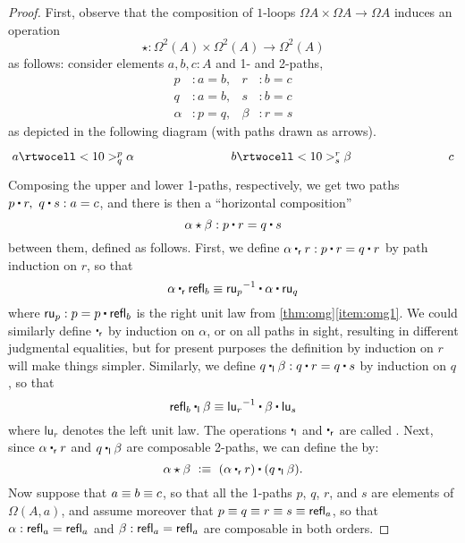 \begin{proof}
First, observe that the composition of $1$-loops $\Omega A\times \Omega A\to \Omega A$ induces an operation
\[
\star : \Omega^2(A)\times \Omega^2(A)\to \Omega^2(A)
\]
as follows: consider elements $a, b, c : A$ and 1- and 2-paths,
%
\begin{align*}
  p &: a = b,       &       r &: b = c \\
  q &: a = b,       &       s &: b = c \\
  \alpha &: p = q,  &   \beta &: r = s
\end{align*}
%
as depicted in the following diagram (with paths drawn as arrows).
\[
 \xymatrix@+5em{
   {a} \rtwocell<10>^p_q{\alpha}
   &
   {b} \rtwocell<10>^r_s{\beta}
   &
   {c}
 }
\]
Composing the upper and lower 1-paths, respectively, we get two paths $p\ct r,\ q\ct s : a = c$, and there is then a ``horizontal composition''
%
\begin{equation*}
  \alpha\hct\beta : p\ct r = q\ct s
\end{equation*}
%
between them, defined as follows.
First, we define $\alpha \rightwhisker r : p\ct r = q\ct r$ by path induction on $r$, so that
\[ \alpha \rightwhisker \refl{b} \jdeq \opp{\mathsf{ru}_p} \ct \alpha \ct \mathsf{ru}_q \]
where $\mathsf{ru}_p : p = p \ct \refl{b}$ is the right unit law from \cref{thm:omg}\ref{item:omg1}.
We could similarly define $\rightwhisker$ by induction on $\alpha$, or on all paths in sight, resulting in different judgmental equalities, but for present purposes the definition by induction on $r$ will make things simpler.
Similarly, we define $q\leftwhisker \beta : q\ct r = q\ct s$ by induction on $q$, so that
\[ \refl{b} \leftwhisker \beta \jdeq \opp{\mathsf{lu}_r} \ct \beta \ct \mathsf{lu}_s \]
where $\mathsf{lu}_r$ denotes the left unit law.
The operations $\leftwhisker$ and $\rightwhisker$ are called .
Next, since $\alpha \rightwhisker r$ and $q\leftwhisker \beta$ are composable 2-paths, we can define the 
%
%
by:
\[
\alpha\hct\beta\ \defeq\ (\alpha\rightwhisker r) \ct (q\leftwhisker \beta).
\]
Now suppose that $a \equiv  b \equiv  c$, so that all the 1-paths $p$, $q$, $r$, and $s$ are elements of $\Omega(A,a)$, and assume moreover that $p\equiv q \equiv r \equiv s\equiv \mathsf{refl}_{a}$, so that $\alpha:\mathsf{refl}_{a} = \mathsf{refl}_{a}$ and $\beta:\mathsf{refl}_{a} = \mathsf{refl}_{a}$ are composable in both orders.

\end{proof}
